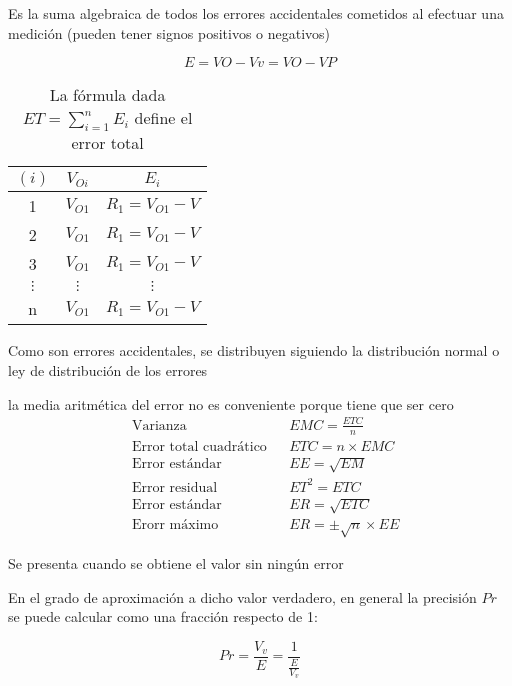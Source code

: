 \begin{definition}
    Es la suma algebraica de todos los errores accidentales cometidos al efectuar una medición (pueden tener signos positivos o negativos)
\end{definition}
\begin{equation}
    E=VO-Vv=VO-VP
\end{equation}

\begin{table}[h!]
    \centering\begin{tabular}{|c|c|c|}
    \hline
    $(i)$   & $V_{Oi}$ & $E_i$          \\ \hline
    1       & $V_{O1}$ & $R_1=V_{O1}-V$ \\ \hline
    2       & $V_{O1}$ & $R_1=V_{O1}-V$ \\ \hline
    3       & $V_{O1}$ & $R_1=V_{O1}-V$ \\ \hline
    $\vdots$& $\vdots$ & $\vdots$       \\ \hline
    n       & $V_{O1}$ & $R_1=V_{O1}-V$ \\ \hline
    \end{tabular}
    \caption{La fórmula dada $ET=\sum_{i=1}^n E_i$ define el error total}
    \label{tabta8}
    \end{table}

Como son errores accidentales, se distribuyen siguiendo la distribución normal o ley de distribución de los errores

la media aritmética del error no es conveniente porque tiene que ser cero
\begin{align*}
    &\text{Varianza}&&EMC=\frac{ETC}{n}\\
    &\text{Error total cuadrático}&&ETC=n\times EMC\\ 
    &\text{Error estándar}&&EE=\sqrt{EM}\\
    &\text{Error residual}&&ET^2=ETC\\
    &\text{Error estándar}&&ER=\sqrt{ETC}\\
    &\text{Erorr máximo}&&ER=\pm\sqrt{n}\times EE
\end{align*}

\begin{definition}[Exactitud]
    Se presenta cuando se obtiene el valor sin ningún error
\end{definition}

\begin{definition}[Precisión]
    En el grado de aproximación a dicho valor verdadero, en general la precisión $Pr$ se puede calcular como una fracción respecto de 1: 
\end{definition}
\begin{equation}
    Pr=\frac{V_v}{E}=\frac{1}{\frac{E}{V_v}}
\end{equation}

